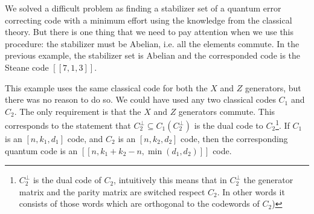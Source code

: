We solved a difficult problem as finding a stabilizer set of a quantum error correcting code with a minimum effort using the knowledge from the classical theory.
But there is one thing that we need to pay attention when we use this procedure: the stabilizer must be Abelian, i.e. all the elements commute.
In the previous example, the stabilizer set is Abelian and the corresponded code is the Steane code $[[7,1,3]]$.
 
This example uses the same classical code for both the $X$ and $Z$ generators, but there was no reason to do so. We could have used any two classical codes $C_{1}$ and $C_{2}$. The only requirement is that the $X$ and $Z$ generators commute. This corresponds to the statement that $C_{2}^{\perp} \subseteq C_{1}\left(C_{2}^{\perp}\right)$ is the dual code to $C_{2}$\footnote{$C_2^{\perp}$ is the dual code of $C_2$, intuitively this means that in $C_2^{\perp}$ the generator matrix and the parity matrix are switched respect $C_2$. In other words it consists  of those words which are orthogonal to the codewords of $C_{2}$)}.
If $C_{1}$ is an $\left[n, k_{1}, d_{1}\right]$ code, and $C_{2}$ is an $\left[n, k_{2}, d_{2}\right]$ code, then the corresponding quantum code is an $\left[\left[n, k_{1}+k_{2}-n, \min \left(d_{1}, d_{2}\right)\right]\right]$ code. 


